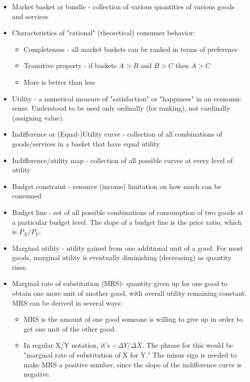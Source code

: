 \documentclass{exam}
\begin{document}
\begin{itemize}
  \item Market basket or bundle - collection of various quantities of various goods and services
  \item Characteristics of "rational" (theoretical) consumer behavior:
    \begin{itemize}
      \item Completeness - all market baskets can be ranked in terms of preference
      \item Transitive property - if baskets $A > B$ and $B > C$ then $A > C$
      \item More is better than less
    \end{itemize}
  \item Utility - a numerical measure of "satisfaction" or "happiness" in an economic sense.  Understood to be used only ordinally (for ranking), not cardinally (assigning value).
  \item Indifference or (Equal-)Utility curve - collection of all combinations of goods/services in a basket that have equal utility
  \item Indifference/utility map - collection of all possible curves at every level of utility
  \item Budget constraint - resource (income) limitation on how much can be consumed
  \item  Budget line - set of all possible combinations of consumption of two goods at a particular budget level.  The slope
    of a budget line is the price ratio, which is $P_X / P_Y$.
  \item Marginal utility - utility gained from one additional unit of a good.  For most goods, marginal utility is
    eventually diminishing (decreasing) as quantity rises.
  \item Marginal rate of substitution (MRS)- quantity given up for one good to obtain one more unit of another good, with
    overall utility remaining constant.  MRS can be derived in several ways:
    \begin{itemize}
      \item MRS is the amount of one good someone is willing to give up in order to get one unit
        of the other good.
      \item In regular X/Y notation, it's $-\Delta Y / \Delta X$.  The phrase for this would be "marginal rate
        of substitution of X for Y." The minus sign is needed to make MRS a positive number, since the
        slope of the indifference curve is negative.

\end{itemize}
\end{itemize}
\end{document}
